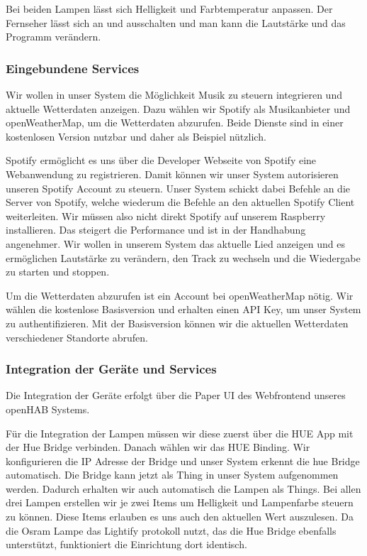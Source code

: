 		Bei beiden Lampen lässt sich Helligkeit und Farbtemperatur anpassen. Der Fernseher lässt sich an und ausschalten und man kann die Lautstärke und das Programm verändern.
		
		\subsubsection{Eingebundene Services}
		Wir wollen in unser System die Möglichkeit Musik zu steuern integrieren und aktuelle Wetterdaten anzeigen. Dazu wählen wir Spotify als Musikanbieter und openWeatherMap, um die Wetterdaten abzurufen. Beide Dienste sind in einer kostenlosen Version nutzbar und daher als Beispiel nützlich.
		
		Spotify ermöglicht es uns über die Developer Webseite von Spotify eine Webanwendung zu registrieren. Damit können wir unser System autorisieren unseren Spotify Account zu steuern. Unser System schickt dabei Befehle an die Server von Spotify, welche wiederum die Befehle an den aktuellen Spotify Client weiterleiten. Wir müssen also nicht direkt Spotify auf unserem Raspberry installieren. Das steigert die Performance und ist in der Handhabung angenehmer. Wir wollen in unserem System das aktuelle Lied anzeigen und es ermöglichen Lautstärke zu verändern, den Track zu wechseln und die Wiedergabe zu starten und stoppen.
		
		Um die Wetterdaten abzurufen ist ein Account bei openWeatherMap nötig. Wir wählen die kostenlose Basisversion und erhalten einen API Key, um unser System zu authentifizieren. Mit der Basisversion können wir die aktuellen Wetterdaten verschiedener Standorte abrufen.
		
		\subsubsection{Integration der Geräte und Services}
		Die Integration der Geräte erfolgt über die Paper UI des Webfrontend unseres openHAB Systems. 
		
		Für die Integration der Lampen müssen wir diese zuerst über die HUE App mit der Hue Bridge verbinden. Danach wählen wir das HUE Binding. Wir konfigurieren die IP Adresse der Bridge und unser System erkennt die hue Bridge automatisch. Die Bridge kann jetzt als Thing in unser System aufgenommen werden. Dadurch erhalten wir auch automatisch die Lampen als Things. Bei allen drei Lampen erstellen wir je zwei Items um Helligkeit und Lampenfarbe steuern zu können. Diese Items erlauben es uns auch den aktuellen Wert auszulesen. Da die Osram Lampe das Lightify protokoll nutzt, das die Hue Bridge ebenfalls unterstützt, funktioniert die Einrichtung dort identisch.
		
